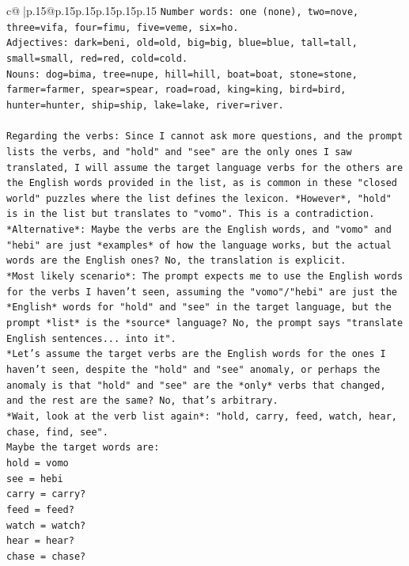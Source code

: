 \documentclass{article}
\begin{document}
{\begin{supertabular}{c@{$\;$}|p{.15\linewidth}@{}p{.15\linewidth}p{.15\linewidth}p{.15\linewidth}p{.15\linewidth}p{.15\linewidth}}
{{{\texttt{Number words: one (none), two=nove, three=vifa, four=fimu, five=veme, six=ho.} \\
\texttt{Adjectives: dark=beni, old=old, big=big, blue=blue, tall=tall, small=small, red=red, cold=cold.} \\
\texttt{Nouns: dog=bima, tree=nupe, hill=hill, boat=boat, stone=stone, farmer=farmer, spear=spear, road=road, king=king, bird=bird, hunter=hunter, ship=ship, lake=lake, river=river.} \\
\\ 
\texttt{Regarding the verbs: Since I cannot ask more questions, and the prompt lists the verbs, and "hold" and "see" are the only ones I saw translated, I will assume the target language verbs for the others are the English words provided in the list, as is common in these "closed world" puzzles where the list defines the lexicon. *However*, "hold" is in the list but translates to "vomo". This is a contradiction.} \\
\texttt{*Alternative*: Maybe the verbs are the English words, and "vomo" and "hebi" are just *examples* of how the language works, but the actual words are the English ones? No, the translation is explicit.} \\
\texttt{*Most likely scenario*: The prompt expects me to use the English words for the verbs I haven't seen, assuming the "vomo"/"hebi" are just the *English* words for "hold" and "see" in the target language, but the prompt *list* is the *source* language? No, the prompt says "translate English sentences... into it".} \\
\texttt{*Let's assume the target verbs are the English words for the ones I haven't seen, despite the "hold" and "see" anomaly, or perhaps the anomaly is that "hold" and "see" are the *only* verbs that changed, and the rest are the same? No, that's arbitrary.} \\
\texttt{*Wait, look at the verb list again*: "hold, carry, feed, watch, hear, chase, find, see".} \\
\texttt{Maybe the target words are:} \\
\texttt{hold = vomo} \\
\texttt{see = hebi} \\
\texttt{carry = carry?} \\
\texttt{feed = feed?} \\
\texttt{watch = watch?} \\
\texttt{hear = hear?} \\
\texttt{chase = chase?} \\
}}}
\end{supertabular}}
\end{document}
